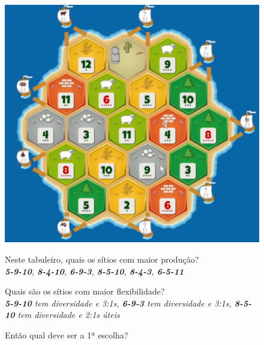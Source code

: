 \documentclass[12pt]{article}
\begin{document}
\vspace{-0.5cm}
\begin{figure}[h]
    \begin{minipage}{0.45\textwidth}
        \centering
        \includegraphics[width=\textwidth]{../imgs/example_board_1.png}
        \label{fig:example_board_1}
    \end{minipage}
    \hfill
    \begin{minipage}{0.5\textwidth}
        \raggedright
            Neste tabuleiro, quais os sítios com maior produção? \\
            \textit{\textbf{5-9-10}, \textbf{8-4-10}, \textbf{6-9-3}, \textbf{8-5-10}, \textbf{8-4-3}, \textbf{6-5-11}} \\
            \vspace{0.5cm}

            Quais são os sítios com maior flexibilidade? \\
            \textit{\textbf{5-9-10} tem diversidade e 3:1s, 
            \textbf{6-9-3} tem diversidade e 3:1s, 
            \textbf{8-5-10} tem diversidade e 2:1s úteis} \\
            \vspace{0.5cm}

            Então qual deve ser a 1ª escolha? 
            \vspace{0.5cm}
    \end{minipage}
\end{figure}
\end{document}
